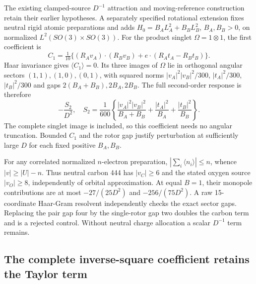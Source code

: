 The existing clamped-source $D^{-1}$ attraction and moving-reference
construction retain their earlier hypotheses. A separately specified
rotational extension fixes neutral rigid atomic preparations and adds
$H_0=B_A L_A^2+B_B L_B^2$, $B_A,B_B>0$, on normalized
$L^2(SO(3)\times SO(3))$. For the product singlet $\Omega=1\otimes1$,
the first coefficient is
\begin{equation}
 C_1=\tfrac1{10}\{(R_Av_A)\cdot(R_Bv_B)
                   +e\cdot(R_At_A-R_Bt_B)\}.
\end{equation}
Haar invariance gives $\langle C_1\rangle=0$. Its three images of
$\Omega$ lie in orthogonal angular sectors $(1,1),(1,0),(0,1)$, with
squared norms $|v_A|^2|v_B|^2/300$, $|t_A|^2/300$, $|t_B|^2/300$ and
gaps $2(B_A+B_B),2B_A,2B_B$. The full second-order response is therefore
\begin{equation}
 -\frac{S_2}{D^2},\quad
 S_2=\frac1{600}\left\{
 \frac{|v_A|^2|v_B|^2}{B_A+B_B}
 +\frac{|t_A|^2}{B_A}+\frac{|t_B|^2}{B_B}\right\}.
\label{eq:rotor-second-12}
\end{equation}
The complete singlet image is included, so this coefficient needs no
angular truncation. Bounded $C_1$ and the rotor gap justify perturbation
at sufficiently large $D$ for each fixed positive $B_A,B_B$.

For any correlated normalized $n$-electron preparation,
$|\sum_i\langle n_i\rangle|\le n$, whence $|v|\ge|U|-n$.
Thus neutral carbon 444 has $|v_C|\ge6$ and the stated oxygen source
$|v_O|\ge8$, independently of orbital approximation. At equal $B=1$,
their monopole contributions are at most $-27/(25D^2)$ and
$-256/(75D^2)$. A raw 15-coordinate Haar-Gram resolvent independently
checks the exact sector gaps. Replacing the pair gap four by the
single-rotor gap two doubles the carbon term and is a rejected control.
Without neutral charge allocation a scalar $D^{-1}$ term remains.

\subsection{The complete inverse-square coefficient retains the Taylor term}
\label{sec:rotor-full-tail-12}

